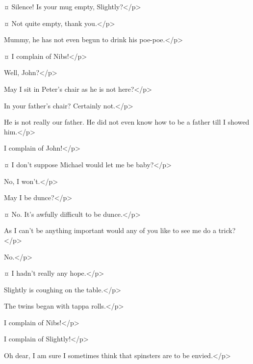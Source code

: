 \begin{drama}

\wendyspeaks {}¤
Silence!
Is your mug empty, Slightly?</p>

\slightlyspeaks {}¤
Not quite empty, thank you.</p>

\nibsspeaks
Mummy, he has not even begun to drink his poe-poe.</p>

\slightlyspeaks {}¤
I complain of Nibs!</p>


\wendyspeaks
Well, John?</p>

\johnspeaks
May I sit in Peter's chair as he is not here?</p>

\wendyspeaks
In your father's chair?
Certainly not.</p>

\johnspeaks
He is not really our father.
He did not even know how to be a father till I showed him.</p>


\secondtwinspeaks
I complain of John!</p>


\tootlesspeaks {}¤
I don't suppose Michael would let me be baby?</p>

\michaelspeaks
No, I won't.</p>

\tootlesspeaks
May I be dunce?</p>

\firsttwinspeaks {}¤
No.
It's awfully difficult to be dunce.</p>

\tootlesspeaks
As I can't be anything important would any of you like to see me do a trick?</p>

No.</p>

\tootlesspeaks {}¤
I hadn't really any hope.</p>


\nibsspeaks
Slightly is coughing on the table.</p>

\curlyspeaks
The twins began with tappa rolls.</p>

\slightlyspeaks
I complain of Nibs!</p>

\nibsspeaks
I complain of Slightly!</p>

\wendyspeaks
Oh dear, I am sure I sometimes think that spinsters are to be envied.</p>


\end{drama}
